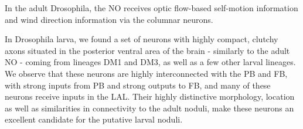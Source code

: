 \documentclass{article}
\begin{document}




In the adult Drosophila, the NO receives optic flow-based self-motion information and wind direction information via the columnar neurons. %

In Drosophila larva, we found a set of neurons with highly compact, clutchy axons situated in the posterior ventral area of the brain - similarly to the adult NO - coming from lineages DM1 and DM3, as well as a few other larval lineages. We observe that these neurons are highly interconnected with the PB and FB,  with strong inputs from 
PB and strong outputs to FB, and many of these neurons receive inputs in the LAL.
Their highly distinctive morphology, location as well as similarities in connectivity to the adult noduli, make these neurons an excellent candidate for the putative larval noduli.
\end{document}
